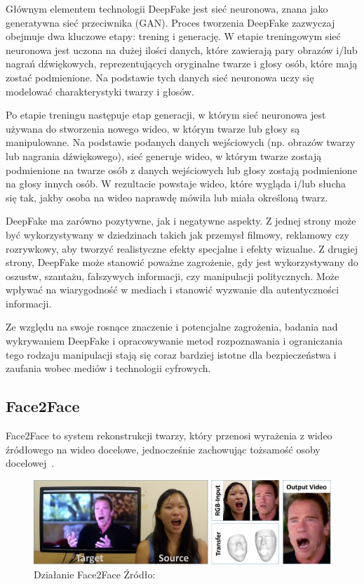 Głównym elementem technologii DeepFake jest sieć neuronowa, znana jako generatywna sieć przeciwnika (GAN)\cite{tolosana2020deepfakes}.
Proces tworzenia DeepFake zazwyczaj obejmuje dwa kluczowe etapy: trening i generację. W etapie treningowym sieć neuronowa jest uczona na dużej ilości danych, które zawierają pary obrazów i/lub nagrań dźwiękowych, reprezentujących oryginalne twarze i głosy osób, które mają zostać podmienione.
Na podstawie tych danych sieć neuronowa uczy się modelować charakterystyki twarzy i głosów.

Po etapie treningu następuje etap generacji, w którym sieć neuronowa jest używana do stworzenia nowego wideo, w którym twarze lub głosy są manipulowane.
Na podstawie podanych danych wejściowych (np. obrazów twarzy lub nagrania dźwiękowego), sieć generuje wideo, w którym twarze zostają podmienione na twarze osób z danych wejściowych lub głosy zostają podmienione na głosy innych osób. W rezultacie powstaje wideo, które wygląda i/lub słucha się tak, jakby osoba na wideo naprawdę mówiła lub miała określoną twarz.

DeepFake ma zarówno pozytywne, jak i negatywne aspekty. Z jednej strony może być wykorzystywany w dziedzinach takich jak przemysł filmowy, reklamowy czy rozrywkowy, aby tworzyć realistyczne efekty specjalne i efekty wizualne. Z drugiej strony, DeepFake może stanowić poważne zagrożenie, gdy jest wykorzystywany do oszustw, szantażu, fałszywych informacji, czy manipulacji politycznych.
Może wpływać na wiarygodność w mediach i stanowić wyzwanie dla autentyczności informacji.

Ze względu na swoje rosnące znaczenie i potencjalne zagrożenia, badania nad wykrywaniem DeepFake i opracowywanie metod rozpoznawania i ograniczania tego rodzaju manipulacji stają się coraz bardziej istotne dla bezpieczeństwa i zaufania wobec mediów i technologii cyfrowych.

\subsection{Face2Face}

Face2Face to system rekonstrukcji twarzy, który przenosi wyrażenia z wideo źródłowego na wideo docelowe, jednocześnie zachowując tożsamość osoby docelowej~\cite{thies2020face2face}.

\begin{figure}[h]
    \includegraphics[width=0.9\linewidth]{img/Face2Face}
    \caption{ Działanie Face2Face Źródło:~\cite{thies2020face2face}}
    \label{img:face2face}
\end{figure}

